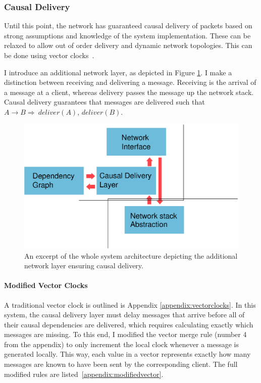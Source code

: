 \documentclass[12pt,a4paper,twoside,openright]{report}
\begin{document}
		
		\subsubsection{Causal Delivery} \label{sec:causaldelivery}
		Until this point, the network has guaranteed causal delivery of packets based on strong assumptions and knowledge of the system implementation. These can be relaxed to allow out of order delivery and dynamic network topologies. This can be done using vector clocks~\cite{fidge1987}.
		
		I introduce an additional network layer, as depicted in Figure \ref{fig:causal}. I make a distinction between receiving and delivering a message. Receiving is the arrival of a message at a client, whereas delivery passes the message up the network stack. Causal delivery guarantees that messages are delivered such that $A \rightarrow B \Rightarrow\ deliver(A)$, $deliver(B)$.
		
				
	\begin{figure}[H]
	\centering
	\includegraphics[width=1\linewidth]{figs/causal_arch.eps}
	\caption[Ensuring Causal Delivery]{An excerpt of the whole system architecture depicting the additional network layer ensuring causal delivery.}
	\label{fig:causal}
	\end{figure}

	
		\paragraph{Modified Vector Clocks} \label{sec:modifiedvectors}
		A traditional vector clock is outlined is Appendix \ref{appendix:vectorclocks}. In this system, the causal delivery layer must delay messages that arrive before all of their causal dependencies are delivered, which requires calculating exactly which messages are missing. To this end, I modified the vector merge rule (number 4 from the appendix) to only increment the local clock whenever a message is generated locally. This way, each value in a vector represents exactly how many messages are known to have been sent by the corresponding client. The full modified rules are listed~\cref{appendix:modifiedvector}.
		
\end{document}
